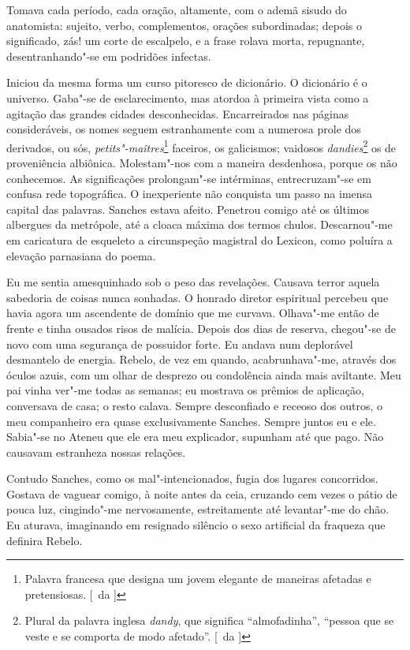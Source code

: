 Tomava cada período, cada oração,
altamente, com o ademã sisudo do anatomista: sujeito, verbo,
complementos, orações subordinadas; depois o significado, zás! um corte
de escalpelo, e a frase rolava morta, repugnante, desentranhando"-se
em podridões infectas. 

Iniciou da mesma forma um curso pitoresco de
dicionário. O dicionário é o universo. Gaba"-se de esclarecimento, mas
atordoa à primeira vista como a agitação das grandes cidades
desconhecidas. Encarreirados nas páginas consideráveis, os nomes seguem
estranhamente com a numerosa prole dos derivados, ou sós,
\textit{petits"-maîtres}\footnote{ Palavra francesa que designa um jovem elegante 
de maneiras afetadas e pretensiosas. [~da ]} 
faceiros, os galicismos; vaidosos \textit{dandies}\footnote{ Plural da palavra 
inglesa \textit{dandy}, que significa ``almofadinha'', 
``pessoa que se veste e se comporta de modo afetado''. [~da ]} os de
proveniência albiônica. Molestam"-nos com a maneira desdenhosa, porque
os não conhecemos. As significações prolongam"-se intérminas,
entrecruzam"-se em confusa rede topográfica. O inexperiente não
conquista um passo na imensa capital das palavras. Sanches estava
afeito. Penetrou comigo até os últimos albergues da metrópole, até a cloaca máxima dos termos chulos.
Descarnou"-me em caricatura de esqueleto a circunspeção magistral do
Lexicon, como poluíra a elevação parnasiana do poema. 

Eu me sentia amesquinhado sob o peso das revelações. Causava terror aquela sabedoria
de coisas nunca sonhadas. O honrado diretor espiritual percebeu que
havia agora um ascendente de domínio que me curvava. Olhava"-me então
de frente e tinha ousados risos de malícia. Depois dos dias de reserva,
chegou"-se de novo com uma segurança de possuidor forte. Eu andava num
deplorável desmantelo de energia. Rebelo, de vez em quando,
acabrunhava"-me, através dos óculos azuis, com um olhar de desprezo ou
condolência ainda mais aviltante. Meu pai vinha ver"-me todas as
semanas; eu mostrava os prêmios de aplicação, conversava de casa; o
resto calava. Sempre desconfiado e receoso dos outros, o meu
companheiro era quase exclusivamente Sanches. Sempre juntos eu e ele.
Sabia"-se no Ateneu que ele era meu explicador, supunham até que pago.
Não causavam estranheza nossas relações. 

Contudo Sanches, como os mal"-intencionados, fugia dos lugares concorridos. 
Gostava de vaguear comigo, à noite antes da ceia, cruzando cem vezes o pátio de pouca luz,
cingindo"-me nervosamente, estreitamente até levantar"-me do chão. Eu
aturava, imaginando em resignado silêncio o sexo artificial da fraqueza
que definira Rebelo. 

